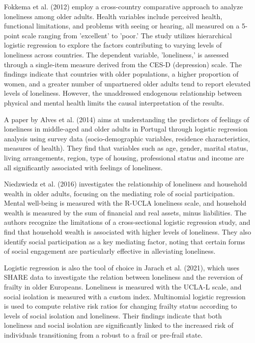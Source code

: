     Fokkema et al. (2012) employ a cross-country comparative approach to analyze loneliness among older adults. Health variables include perceived health, functional limitations, and problems with seeing or hearing, all measured on a 5-point scale ranging from 'excellent' to 'poor.' The study utilizes hierarchical logistic regression to explore the factors contributing to varying levels of loneliness across countries. The dependent variable, 'loneliness,' is assessed through a single-item measure derived from the CES-D (depression) scale.
    The findings indicate that countries with older populations, a higher proportion of women, and a greater number of unpartnered older adults tend to report elevated levels of loneliness. However, the unaddressed endogenous relationship between physical and mental health limits the causal interpretation of the results.

    A paper by Alves et al. (2014) aims at understanding the predictors of feelings of loneliness in middle-aged and older adults in Portugal through logistic regression analysis using survey data (socio-demographic variables, residence characteristics, measures of health). They find that variables such as age, gender, marital status, living arrangements, region, type of housing, professional status and income are all significantly associated with feelings of loneliness. 

    Niedzwiedz et al. (2016) investigates the relationship of loneliness and household wealth in older adults, focusing on the mediating role of social participation. Mental well-being is measured with the R-UCLA loneliness scale, and household wealth is measured by the sum of financial and real assets, minus liabilities. The authors recognize the limitations of a cross-sectional logistic regression study, and find that household wealth is associated with higher levels of loneliness. They also identify social participation as a key mediating factor, noting that certain forms of social engagement are particularly effective in alleviating loneliness.

    Logistic regression is also the tool of choice in Jarach et al. (2021), which uses SHARE data to investigate the relation between loneliness and the reversion of frailty in older Europeans. Loneliness is measured with the UCLA-L scale, and social isolation is measured with a custom index. 
    Multinomial logistic regression is used to compute relative risk ratios for changing frailty status according to levels of social isolation and loneliness. Their findings indicate that both loneliness and social isolation are significantly linked to the increased risk of individuals transitioning from a robust to a frail or pre-frail state.

